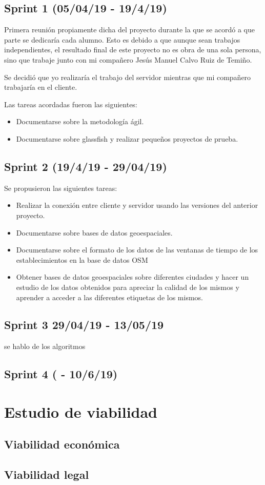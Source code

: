 \subsection{Sprint 1 (05/04/19 - 19/4/19)}
Primera reunión propiamente dicha del proyecto durante la que se acordó a que parte se dedicaría cada alumno. Esto es debido a que aunque sean trabajos independientes, el resultado final de este proyecto no es obra de una sola persona, sino que trabaje junto con mi compañero Jesús Manuel Calvo Ruiz de Temiño.

Se decidió que yo realizaría el trabajo del servidor mientras que mi compañero trabajaría en el cliente.

Las tareas acordadas fueron las siguientes:
\begin{itemize}
\item Documentarse sobre la metodología ágil.
\item Documentarse sobre glassfish\cite{wiki:glassfish} y realizar pequeños proyectos de prueba.
\end{itemize}

\subsection{Sprint 2 (19/4/19 - 29/04/19)}
Se propusieron las siguientes tareas:
\begin{itemize}
\item Realizar la conexión entre cliente y servidor usando las versiones del anterior proyecto.
\item Documentarse sobre bases de datos geoespaciales.
\item Documentarse sobre el formato de los datos de las ventanas de tiempo de los establecimientos en la base de datos OSM\cite{wiki:osm}
\item Obtener bases de datos geoespaciales sobre diferentes ciudades y hacer un estudio de los datos obtenidos para apreciar la calidad de los mismos y aprender a acceder a las diferentes etiquetas de los mismos.
\end{itemize}

\subsection{Sprint 3 29/04/19 - 13/05/19}
se hablo de los algoritmos
\subsection{Sprint 4 ( - 10/6/19)}

\section{Estudio de viabilidad}

\subsection{Viabilidad económica}

\subsection{Viabilidad legal}


